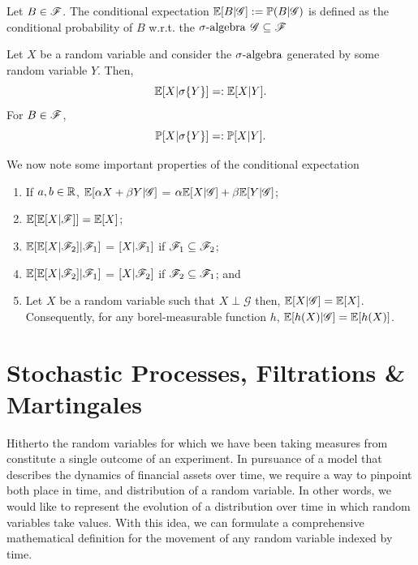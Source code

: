 \documentclass[../TGMAFFIRO.tex]{subfiles}
\begin{document}
\begin{definition}
	Let $B\in\mathscr{F}$. The conditional expectation $\mathbb{E}[B | \mathscr{G}] := \mathbb{P}(B | \mathscr{G})$ is defined as the conditional probability of $B$ w.r.t. the $\sigma\text{-algebra}$ $\mathscr{G} \subseteq \mathscr{F}$
\end{definition}


\begin{definition}
	Let $X$ be a random variable and consider the $\sigma\text{-algebra}$ generated by some random variable $Y$. Then,
	\begin{equation}
		\mathbb{E}[X | \sigma\{Y\}] =: \mathbb{E}[X | Y].
	\end{equation}
	For $B \in \mathscr{F}$,
	\begin{equation}
		\mathbb{P}[X | \sigma\{Y\}] =: \mathbb{P}[X | Y].
	\end{equation}
\end{definition}

\begin{proposition}
	We now note some important properties of the conditional expectation
	\begin{enumerate}
		\item If $a, b \in \mathbb{R}$, $\mathbb{E}[\alpha X + \beta Y | \mathscr{G}]$ = $\alpha \mathbb{E}[X | \mathscr{G}] + \beta\mathbb{E}[Y | \mathscr{G}]$;
		\item $\mathbb{E}[\mathbb{E}[X | \mathscr{F}]] = \mathbb{E}[X]$;
		\item $\mathbb{E}[\mathbb{E}[X | \mathscr{F}_2] | \mathscr{F}_1]$ = $[X | \mathscr{F}_1]$ if $\mathscr{F}_1 \subseteq \mathscr{F}_2$;
		\item $\mathbb{E}[\mathbb{E}[X | \mathscr{F}_2] | \mathscr{F}_1]$ = $[X | \mathscr{F}_2]$ if $\mathscr{F}_2 \subseteq \mathscr{F}_1$; and
		\item Let $X$ be a random variable such that $X \perp \mathscr{G}$ then, $\mathbb{E}[X|\mathscr{G}] = \mathbb{E}[X]$. Consequently, for any borel-measurable function $h$, $\mathbb{E}[h(X)|\mathscr{G}] = \mathbb{E}[h(X)]$.
	\end{enumerate}
\end{proposition}


\section{Stochastic Processes, Filtrations \& Martingales}
Hitherto the random variables for which we have been taking measures from constitute a single outcome of an experiment. In pursuance of a model that describes the dynamics of financial assets over time, we require a way to pinpoint both place in time, and distribution of a random variable. In other words, we would like to represent the evolution of a distribution over time in which random variables take values. With this idea, we can formulate a comprehensive mathematical definition for the movement of any random variable indexed by time.
\end{document}
